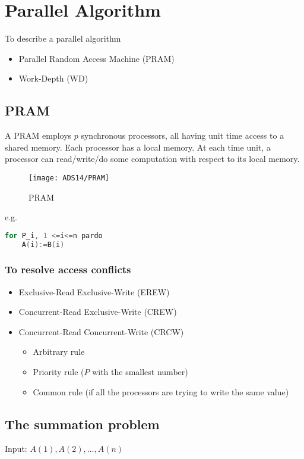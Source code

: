 \newpage
\section{Parallel Algorithm}

To describe a parallel algorithm
\begin{itemize}
    \item Parallel Random Access Machine (PRAM)
    \item Work-Depth (WD)
\end{itemize}

\subsection{PRAM}
A PRAM employs $p$ synchronous processors, all having unit time access to a shared memory. Each processor has a local memory. At each time unit, a processor can read/write/do some computation with respect to its local memory. 

\begin{figure}[!htb]
    \centering
    \texttt{[image: ADS14/PRAM]}
    \caption{PRAM}
\end{figure}

e.g.
\begin{lstlisting}[language={c++}]
for P_i, 1 <=i<=n pardo
    A(i):=B(i)
\end{lstlisting}

\subsubsection{To resolve access conflicts}
\begin{itemize}
    \item Exclusive-Read Exclusive-Write (EREW)
    \item Concurrent-Read Exclusive-Write (CREW)
    \item Concurrent-Read Concurrent-Write (CRCW)
    \begin{itemize}
        \item Arbitrary rule
        \item Priority rule ($P$ with the smallest number)
        \item Common rule (if all the processors are trying to write the same value)
    \end{itemize}   
\end{itemize}

\subsection{The summation problem}
Input:  $A(1), A(2), \dots, A(n)$

